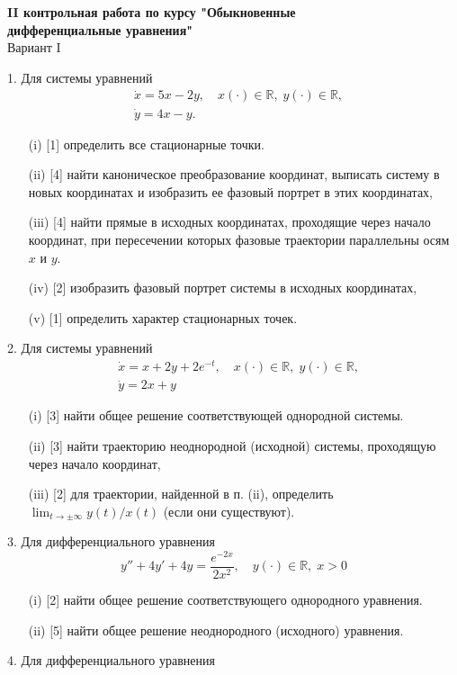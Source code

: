 \documentclass[a4paper, 12pt]{article}
\begin{document}
\begin{center}
\textbf{II контрольная работа по курсу "Обыкновенные \\
дифференциальные уравнения"
}\\
{Вариант I}
\end{center}
1. Для системы уравнений
$$
\begin{aligned}
&\dot{x}=5 x-2 y, \quad x(\cdot) \in \mathbb{R}, \; y(\cdot) \in \mathbb{R}, \\
&\dot{y}=4 x- y .
\end{aligned}
$$
\begin{itemize}
\item [(i)][1] определить все стационарные точки.
\item [(ii)][4] найти каноническое преобразование координат, выписать систему в новых координатах и изобразить ее фазовый портрет в этих координатах,
\item [(iii)][4] найти прямые в исходных координатах, проходящие через начало координат, при пересечении которых фазовые траектории параллельны осям $x$ и $y$.
\item [(iv)][2]  изобразить фазовый портрет системы в исходных координатах,
\item [(v)][1]  определить характер стационарных точек.
\end{itemize}
2. Для системы уравнений
$$
\begin{aligned}
&\dot{x}=x+2y+2e^{-t}, \quad x(\cdot) \in \mathbb{R},\; y(\cdot) \in \mathbb{R}, \\
&\dot{y}=2x+y
\end{aligned}
$$
\begin{itemize}
\item [(i)][3] найти общее решение соответствующей однородной системы.
\item [(ii)][3] найти траекторию неоднородной (исходной) системы, проходящую через начало координат,
\item [(iii)][2] для траектории, найденной в п. (ii), определить $\lim _{t \rightarrow \pm \infty} y(t) / x(t)$ (если они существуют).
\end{itemize}
3. Для дифференциального уравнения
$$
y''+4y'+4y=\frac{e^{-2x}}{2x^2}, \quad y(\cdot) \in \mathbb{R},\; x > 0
$$
\begin{itemize}
\item [(i)][2]  найти общее решение соответствующего однородного уравнения.
\item [(ii)][5]  найти общее решение неоднородного (исходного) уравнения.
\end{itemize}
4. Для дифференциального уравнения
\end{document}
